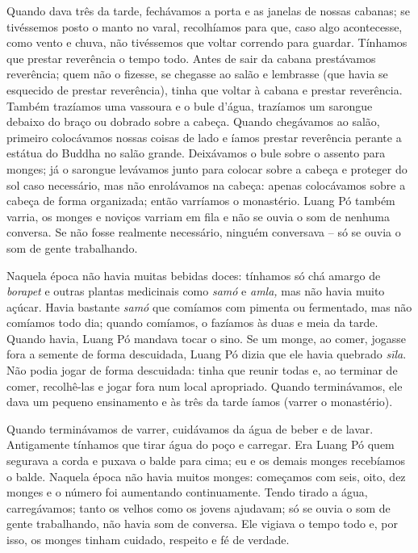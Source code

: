 Quando dava três da tarde, fechávamos a porta e as janelas de nossas
cabanas; se tivéssemos posto o manto no varal, recolhíamos para que,
caso algo acontecesse, como vento e chuva, não tivéssemos que voltar
correndo para guardar. Tínhamos que prestar reverência o tempo todo.
Antes de sair da cabana prestávamos reverência; quem não o fizesse, se
chegasse ao salão e lembrasse (que havia se esquecido de prestar
reverência), tinha que voltar à cabana e prestar reverência. Também
trazíamos uma vassoura e o bule d'água, trazíamos um sarongue debaixo do
braço ou dobrado sobre a cabeça. Quando chegávamos ao salão, primeiro
colocávamos nossas coisas de lado e íamos prestar reverência perante a
estátua do Buddha no salão grande. Deixávamos o bule sobre o assento
para monges; já o sarongue levávamos junto para colocar sobre a cabeça e
proteger do sol caso necessário, mas não enrolávamos na cabeça: apenas
colocávamos sobre a cabeça de forma organizada; então varríamos o
monastério. Luang Pó também varria, os monges e noviços varriam em fila
e não se ouvia o som de nenhuma conversa. Se não fosse realmente
necessário, ninguém conversava -- só se ouvia o som de gente
trabalhando.

Naquela época não havia muitas bebidas doces: tínhamos só chá amargo de
\emph{borapet} e outras plantas medicinais como \emph{samó} e
\emph{amla,} mas não havia muito açúcar. Havia bastante \emph{samó} que
comíamos com pimenta ou fermentado, mas não comíamos todo dia; quando
comíamos, o fazíamos às duas e meia da tarde. Quando havia, Luang Pó
mandava tocar o sino. Se um monge, ao comer, jogasse fora a semente de
forma descuidada, Luang Pó dizia que ele havia quebrado \emph{sīla}. Não
podia jogar de forma descuidada: tinha que reunir todas e, ao terminar
de comer, recolhê-las e jogar fora num local apropriado. Quando
terminávamos, ele dava um pequeno ensinamento e às três da tarde íamos
(varrer o monastério).

Quando terminávamos de varrer, cuidávamos da água de beber e de lavar.
Antigamente tínhamos que tirar água do poço e carregar. Era Luang Pó
quem segurava a corda e puxava o balde para cima; eu e os demais monges
recebíamos o balde. Naquela época não havia muitos monges: começamos com
seis, oito, dez monges e o número foi aumentando continuamente. Tendo
tirado a água, carregávamos; tanto os velhos como os jovens ajudavam; só
se ouvia o som de gente trabalhando, não havia som de conversa. Ele
vigiava o tempo todo e, por isso, os monges tinham cuidado, respeito e
fé de verdade.

